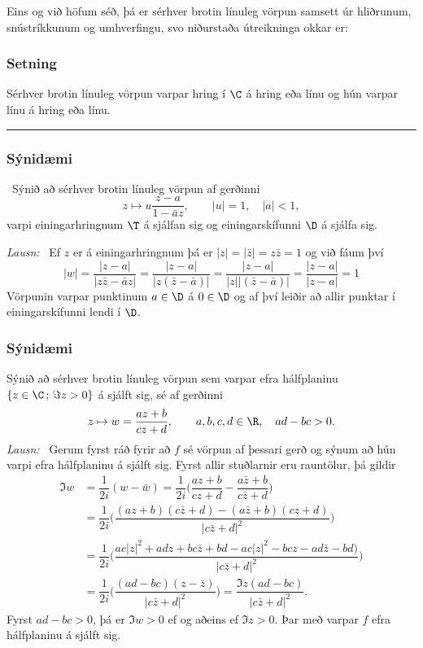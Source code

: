 Eins og við höfum séð, þá er sérhver brotin línuleg vörpun samsett úr
hliðrunum, snústríkkunum og umhverfingu, svo niðurstaða útreikninga
okkar er:
 

\subsubsection{Setning}  Sérhver brotin línuleg vörpun
 varpar hring í $\C$ á hring eða
línu og hún varpar línu á hring eða línu.



\bigskip\hrule \bigskip

\subsubsection{Sýnidæmi}  \ Sýnið að sérhver brotin línuleg vörpun af gerðinni
$$
z\mapsto u\dfrac{z-a}{1-\bar az}, \qquad |u|=1,\quad |a|<1,
$$
varpi einingarhringnum $\T$ á sjálfan sig og einingarskífunni $\D$
á sjálfa sig.

\bigskip\noindent
{\it Lausn:} \   Ef $z$ er á einingarhringnum þá er $|z|=|\bar z|=z\bar
z=1$ og við fáum því
$$
|w|=\dfrac{|z-a|}{|z\bar z-\bar az|}=\dfrac{|z-a|}{|z(\bar z-\bar a)|}
=\dfrac{|z-a|}{|z||(\bar z-\bar a)|}
=\dfrac{|z-a|}{|z-a|}=1
$$
Vörpunin varpar punktinum $a\in \D$ á  $0\in \D$ og af því leiðir að 
allir punktar í einingarskífunni lendi í $\D$. 



\subsubsection{Sýnidæmi}   Sýnið að sérhver brotin línuleg vörpun
sem varpar efra hálfplaninu $\{z\in \C\,;\, \Im z>0\}$ á sjálft sig,
sé af gerðinni
$$
z\mapsto w=\dfrac{az+b}{cz+d}, \qquad a,b,c,d\in \R, \quad ad-bc>0.
$$
{\it Lausn:} \ Gerum fyrst ráð fyrir að $f$ sé vörpun af þessari gerð
og sýnum að hún varpi efra hálfplaninu á sjálft sig.  Fyrst allir
stuðlarnir eru rauntölur, þá gildir
\begin{align*}
\Im w&=\dfrac 1{2i}(w-\bar w)=
\dfrac 1{2i}\bigg(\dfrac{az+b}{cz+d}-\dfrac{a\bar z+b}{c\bar z+d}\bigg)\\
&=\dfrac 1{2i}\bigg(\dfrac{(az+b)(c\bar z+d)-(a\bar z+b)(cz+d)}
{|c\bar z+d|^2}\bigg)\\
&=\dfrac 1{2i}\bigg(\dfrac{ac|z|^2+adz+bc\bar z+bd-ac|z|^2-bcz-ad
\bar z-bd)}
{|c\bar z+d|^2}\bigg)\\
&=\dfrac 1{2i}\bigg(\dfrac{(ad-bc)(z-\bar z)}
{|c\bar z+d|^2}\bigg)=\dfrac{\Im z(ad-bc)}
{|c\bar z+d|^2}.
\end{align*}
Fyrst $ad-bc>0$, þá er $\Im w>0$ ef og aðeins ef $\Im z>0$.  Þar með
varpar $f$ efra hálfplaninu á sjálft sig.

